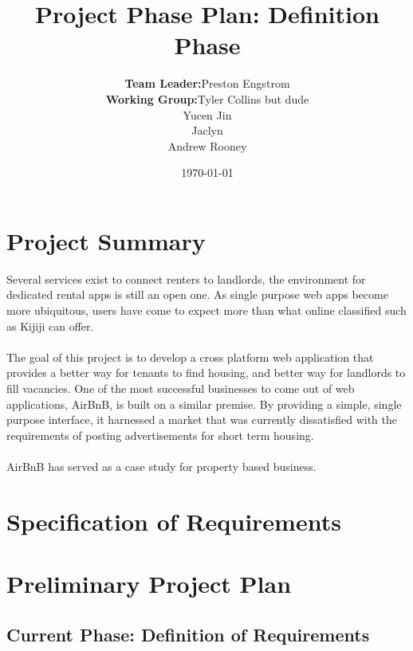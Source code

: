 \documentclass[dvips,12pt]{article}
\begin{document}
\title{Project Phase Plan: Definition Phase}
\author{ \begin{tabular}{rl}
  \textbf{Team Leader:} & Preston Engstrom \\
  \textbf{Working Group:} & Tyler Collins  but dude\\ & Yucen Jin \\ & Jaclyn  \\ & Andrew Rooney
\end{tabular}}

\date{\today}

\maketitle
\newpage 

\tableofcontents
\newpage

\section{Project Summary}
Several services exist to connect renters to landlords, the environment for dedicated rental apps is still an open one. As single purpose web apps become more ubiquitous, users have come to expect more than what online classified such as Kijiji can offer.
\\\\
The goal of this project is to develop a cross platform web application that provides a better way for tenants to find housing, and better way for landlords to fill vacancies. One of the most successful businesses to come out of web applications, AirBnB, is built on a similar premise. By providing a simple, single purpose interface, it harnessed a market that was currently dissatisfied with the requirements of posting advertisements for short term housing. \\\\AirBnB has served as a case study for property based business.


\section{Specification of Requirements}



\section{Preliminary Project Plan}
	\subsection{Current Phase: Definition of Requirements}
	
\end{document}
